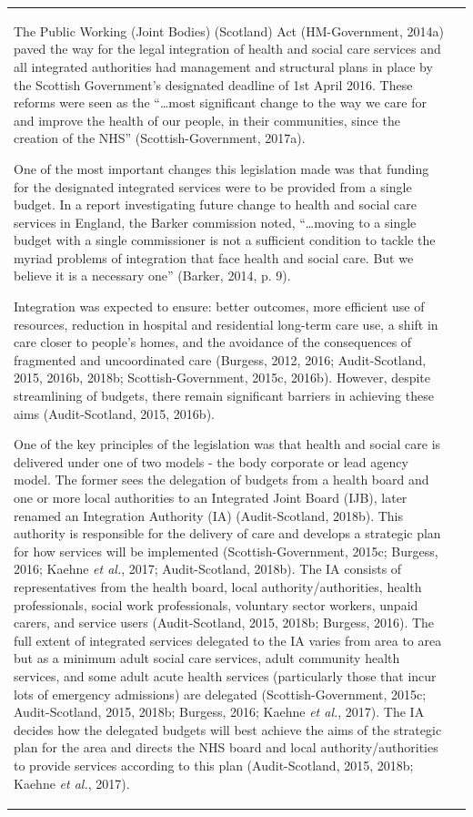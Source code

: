 \documentclass[12pt,a4paper,oneside,table]{report}
\begin{document}
\begin{tabular}[t]{ll}
The Public Working (Joint Bodies) (Scotland) Act (HM-Government, 2014a)
paved the way for the legal integration of health and social care
services and all integrated authorities had management and structural
plans in place by the Scottish Government's designated deadline of 1st
April 2016. These reforms were seen as the ``\ldots{}most significant
change to the way we care for and improve the health of our people, in
their communities, since the creation of the NHS'' (Scottish-Government,
2017a).

One of the most important changes this legislation made was that funding
for the designated integrated services were to be provided from a single
budget. In a report investigating future change to health and social
care services in England, the Barker commission noted, ``\ldots{}moving
to a single budget with a single commissioner is not a sufficient
condition to tackle the myriad problems of integration that face health
and social care. But we believe it is a necessary one'' (Barker, 2014,
p. 9).

Integration was expected to ensure: better outcomes, more efficient use
of resources, reduction in hospital and residential long-term care use,
a shift in care closer to people's homes, and the avoidance of the
consequences of fragmented and uncoordinated care (Burgess, 2012, 2016;
Audit-Scotland, 2015, 2016b, 2018b; Scottish-Government, 2015c, 2016b).
However, despite streamlining of budgets, there remain significant
barriers in achieving these aims (Audit-Scotland, 2015, 2016b).

One of the key principles of the legislation was that health and social
care is delivered under one of two models - the body corporate or lead
agency model. The former sees the delegation of budgets from a health
board and one or more local authorities to an Integrated Joint Board
(IJB), later renamed an Integration Authority (IA) (Audit-Scotland,
2018b). This authority is responsible for the delivery of care and
develops a strategic plan for how services will be implemented
(Scottish-Government, 2015c; Burgess, 2016; Kaehne \emph{et al.}, 2017;
Audit-Scotland, 2018b). The IA consists of representatives from the
health board, local authority/authorities, health professionals, social
work professionals, voluntary sector workers, unpaid carers, and service
users (Audit-Scotland, 2015, 2018b; Burgess, 2016). The full extent of
integrated services delegated to the IA varies from area to area but as
a minimum adult social care services, adult community health services,
and some adult acute health services (particularly those that incur lots
of emergency admissions) are delegated (Scottish-Government, 2015c;
Audit-Scotland, 2015, 2018b; Burgess, 2016; Kaehne \emph{et al.}, 2017).
The IA decides how the delegated budgets will best achieve the aims of
the strategic plan for the area and directs the NHS board and local
authority/authorities to provide services according to this plan
(Audit-Scotland, 2015, 2018b; Kaehne \emph{et al.}, 2017).


\end{tabular}
\end{document}
